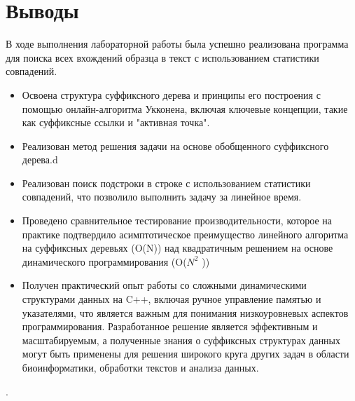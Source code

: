\section{Выводы}
В ходе выполнения лабораторной работы была успешно реализована программа для
поиска всех вхождений образца в текст с использованием статистики совпадений.
\begin{itemize}
    \item Освоена структура суффиксного дерева и принципы его построения с помощью онлайн-алгоритма Укконена, включая ключевые концепции, такие как
суффиксные ссылки и "активная точка".
    \item Реализован метод решения задачи на основе обобщенного суффиксного дерева.d
    \item Реализован поиск подстроки в строке с использованием статистики совпадений, что позволило выполнить задачу за линейное время.
    \item Проведено сравнительное тестирование производительности, которое на практике подтвердило асимптотическое преимущество линейного алгоритма на суффиксных деревьях (O(N)) над квадратичным решением на основе динамического программирования (O($N^2$
))
    \item Получен практический опыт работы со сложными динамическими структурами данных на C++, включая ручное управление памятью и указателями, что
является важным для понимания низкоуровневых аспектов программирования.
Разработанное решение является эффективным и масштабируемым, а полученные
знания о суффиксных структурах данных могут быть применены для решения широкого круга других задач в области биоинформатики, обработки текстов и анализа
данных.
\end{itemize}.
\pagebreak
